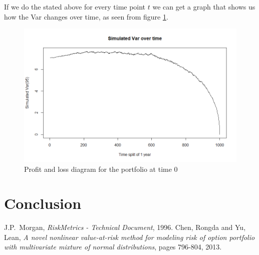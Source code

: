 \documentclass[a4paper, 12pt]{article}
\theoremstyle{definition}
\theoremstyle{plain}
\theoremstyle{definition}
\begin{document}
 \newpage 

If we do the stated above for every time point $t$ we 
can get a graph that shows us how the Var changes over time,
as seen from figure \ref{fig:var}. 

\begin{figure}[!ht]
    \centering
    \caption{Profit and loss diagram for the portfolio
            at time 0}
    \label{fig:var}
    \includegraphics[scale=0.65]{var_sim.png}
 \end{figure}

\section{Conclusion}

\begin{thebibliography}{99}
    J.P.~Morgan, \emph{RiskMetrics - Technical Document}, 1996.
    Chen, Rongda and Yu, Lean, 
    \emph{A novel nonlinear value-at-risk method for modeling risk of option portfolio with multivariate mixture of normal distributions},
    pages 796-804, 2013.
 \end{thebibliography}
 
\end{document}
